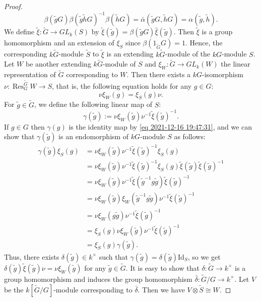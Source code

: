 \documentclass[pdftex,a4paper]{article}
\numberwithin{equation}{subsection}
\theoremstyle{definition}
\newcommand{\restr}{{\operatorname{Res}\nolimits}}
\newcommand{\Id}{\mathrm{Id}}
\begin{document}
\begin{proof}
	\begin{equation}
		\beta(\tilde{g}G)\beta(\tilde{g}\tilde{h}G)^{-1}\beta(\tilde{h}G)=\bar{\alpha}(\tilde{g}G,\tilde{h}G)=\alpha(\tilde{g},\tilde{h}).
	\end{equation}
	We define \(\tilde{\xi} \colon \tilde{G} \rightarrow GL_k(S)\) by \(\tilde{\xi}(\tilde{g})=\beta(\tilde{g}G)\hat{\xi}(\tilde{g})\).
	Then \(\tilde{\xi}\) is a group homomorphism and an extension of \(\xi_S\) since \(\beta(1_{\tilde{G}}G)=1\).
	Hence, the corresponding \(k\tilde{G}\)-module \(\tilde{S}\) to \(\tilde{\xi}\) is an extending \(k\tilde{G}\)-module of the \(kG\)-module \(S\).
	Let \(W\) be another extending \(k\tilde{G}\)-module of \(S\) and \(\xi_W\colon \tilde{G}\rightarrow GL_k(W)\) the  linear representation of \(\tilde{G}\) corresponding to \(W\).
	Then there exists a \(kG\)-isomorphism \(\nu\colon \restr_G^{\tilde{G}}W \rightarrow S\), that is, the following equation holds for any \(g\in G\):
	\begin{equation}\label{eq 2021-12-16 19:47:31}
		\nu \xi_W(g)=\xi_S(g)\nu.
	\end{equation}
	For \(\tilde{g}\in \tilde{G}\), we define the following linear map of \(S\):
	\begin{equation}
		\gamma(\tilde{g}):=\nu\xi_W(\tilde{g})\nu^{-1}\tilde{\xi}(\tilde{g})^{-1}.
	\end{equation}
	If \(g\in G\) then \(\gamma(g)\) is the identity map by \eqref{eq 2021-12-16 19:47:31}, and
	we can show that \(\gamma(\tilde{g})\) is an endomorphism of \(kG\)-module \(S\) as follows:
	\begin{align}
		\gamma(\tilde{g})\xi_S(g)
		 & =\nu\xi_W(\tilde{g})\nu^{-1}\tilde{\xi}(\tilde{g})^{-1}\xi_S(g)                                                  \\
		 & =\nu\xi_W(\tilde{g})\nu^{-1}\tilde{\xi}(\tilde{g})^{-1}\xi_S(g)\tilde{\xi}(\tilde{g})\tilde{\xi}(\tilde{g})^{-1} \\
		 & =\nu\xi_W(\tilde{g})\nu^{-1}\tilde{\xi}(\tilde{g}^{-1}g\tilde{g})\tilde{\xi}(\tilde{g})^{-1}                     \\
		 & =\nu\xi_W(\tilde{g})\xi_W(\tilde{g}^{-1}g\tilde{g})\nu^{-1}\tilde{\xi}(\tilde{g})^{-1}                           \\
		 & =\nu\xi_W(g\tilde{g})\nu^{-1}\tilde{\xi}(\tilde{g})^{-1}                                                         \\
		 & =\xi_S(g)\nu\xi_W(\tilde{g})\nu^{-1}\tilde{\xi}(\tilde{g})^{-1}                                                  \\
		 & =\xi_S(g)\gamma(\tilde{g}).
	\end{align}
	Thus, there exists \(\delta(\tilde{g})\in k^\times\) such that \(\gamma(\tilde{g})=\delta(\tilde{g})\Id_S\), so we get \(\delta(\tilde{g})\tilde{\xi}(\tilde{g})\nu=\nu\xi_W(\tilde{g})\) for any \(\tilde{g}\in\tilde{G}\).
	It is easy to show that \(\delta\colon \tilde{G}\rightarrow k^\times\) is a group homomorphism and induces the group homomorphism \(\bar{\delta}\colon\tilde{G}/G\rightarrow k^\times\).
	Let \(V\) be the \(k[\tilde{G}/G]\)-module corresponding to \(\bar{\delta}\). Then we have \(V\otimes \tilde{S}\cong W\).
\end{proof}
\end{document}
